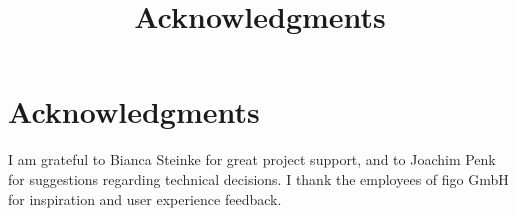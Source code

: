 \title{Acknowledgments}
\chapter*{Acknowledgments}
I am grateful to Bianca Steinke for great project support, and to Joachim Penk for suggestions regarding technical decisions.
I thank the employees of figo GmbH for inspiration and user experience feedback.